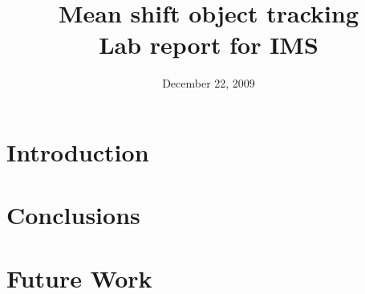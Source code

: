 \documentclass[a4paper,11pt]{article}
\title{Mean shift object tracking\\ Lab report for IMS}
\date{December 22, 2009}
\begin{document}
\maketitle
\section{Introduction}


\section{Conclusions} \label{sec:conc}

\section{Future Work} \label{sec:fut}

% 
% 
\end{document}
